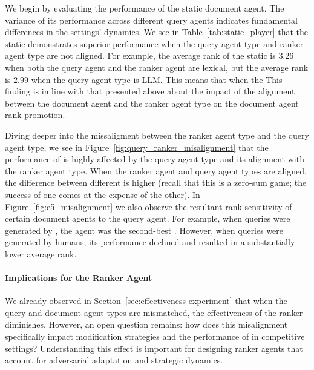 


We begin by evaluating the performance of the static document agent. The variance of its performance across different query agents indicates fundamental differences in the settings' dynamics. We see in Table~\ref{tab:static_player} that the static \botagent demonstrates superior performance when the query agent type and ranker agent type are not aligned.
For example, the average rank of the static \botagent is $3.26$ when both the query agent and the ranker agent are lexical, but the average rank is $2.99$ when the query agent type is LLM. 
This means that when the   This finding is in line with that presented above about the impact of the alignment between the document agent and the ranker agent type on the document agent rank-promotion.



Diving deeper into the missaligment between the ranker agent type and the query agent type, we see in Figure~\ref{fig:query_ranker_misalignment} that the performance of \botagents is highly affected by the query agent type and its alignment with the ranker agent type. 
When the ranker agent and query agent types are aligned, the difference between different \botagents is higher (recall that this is a zero-sum game; the success of one \botagent comes at the expense of the other). 
In Figure~\ref{fig:e5_misalignment} we also observe the resultant rank sensitivity of certain document agents to the query agent. For example, when queries were generated by \efive, the \llama agent was the second-best \botagent. However, when queries were generated by humans, its performance declined and resulted in a substantially lower average rank.

\paragraph{Implications for the Ranker Agent}
We already observed in Section~\ref{sec:effectiveness-experiment} that when the query and document agent types are mismatched, the effectiveness of the ranker diminishes. 
However, an open question remains: how does this misalignment specifically impact modification strategies and the performance of \botagents in competitive settings? Understanding this effect is important for designing ranker agents that account for adversarial adaptation and strategic dynamics. 


